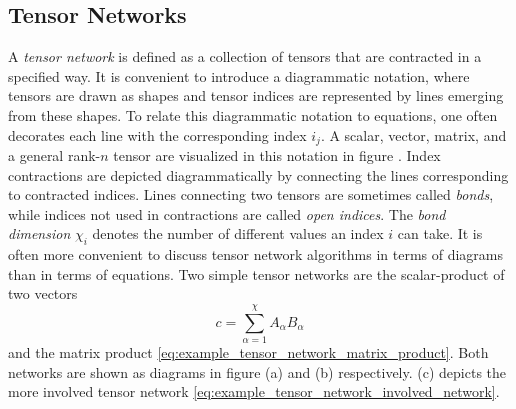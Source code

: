 \subsection*{Tensor Networks}
A \textit{tensor network} is defined as a collection of tensors that are contracted in a specified way. It is convenient to introduce a diagrammatic notation, where tensors are drawn as shapes and tensor indices are represented by lines emerging from these shapes. To relate this diagrammatic notation to equations, one often decorates each line with the corresponding index $i_j$. A scalar, vector, matrix, and a general rank-$n$ tensor are visualized in this notation in figure . Index contractions are depicted diagrammatically by connecting the lines corresponding to contracted indices. Lines connecting two tensors are sometimes called \textit{bonds}, while indices not used in contractions are called \textit{open indices}. The \textit{bond dimension} $\chi_i$ denotes the number of different values an index $i$ can take. It is often more convenient to discuss tensor network algorithms in terms of diagrams than in terms of equations. Two simple tensor networks are the scalar-product of two vectors
\begin{equation}
	\label{eq:example_tensor_network_scalar_product}
	c = \sum_{\alpha=1}^{\chi}A_\alpha B_\alpha
\end{equation}
and the matrix product \eqref{eq:example_tensor_network_matrix_product}. Both networks are shown as diagrams in figure (a) and (b) respectively. (c) depicts the more involved tensor network \eqref{eq:example_tensor_network_involved_network}. \par
